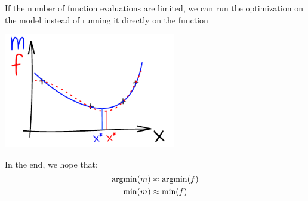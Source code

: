 \documentclass{beamer}
\newcommand{\argmin}{\operatornamewithlimits{argmin}}
\begin{document}
\begin{frame}{}
If the number of function evaluations are limited, we can run the optimization on the model instead of running it directly on the function
\begin{center}
\includegraphics[height=5cm]{figures/ink_mf}
\end{center}
In the end, we hope that:
\begin{equation}
	\begin{split}
		\argmin(m) & \approx \argmin(f)\\
		\min(m) & \approx \min(f)\\
	\end{split}
\end{equation}
\end{frame}
\end{document}
